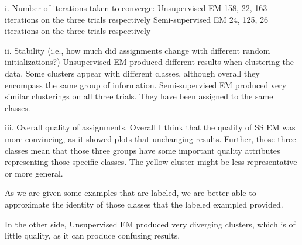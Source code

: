 \begin{answer}

i.  Number of iterations taken to converge:
Unsupervised EM
158, 22, 163 iterations on the three trials respectively
Semi-supervised EM
24, 125, 26 iterations on the three trials respectively


ii. Stability (i.e., how much did assignments change with different random initializations?)
Unsupervised EM produced different results when clustering the data. Some clusters appear with different classes, although overall they encompass the same group of information.
Semi-supervised EM produced very similar clusterings on all three trials. They have been assigned to the same classes.


iii. Overall quality of assignments.
Overall I think that the quality of SS EM was more convincing, as it showed plots that unchanging results. Further, those three classes mean that those three groups have some important quality attributes representing those specific classes. The yellow cluster might be less representative or more general. 

As we are given some examples that are labeled, we are better able to approximate the identity of those classes that the labeled exampled provided.

In the other side, Unsupervised EM produced very diverging clusters, which is of little quality, as it can produce confusing results.

\end{answer}
